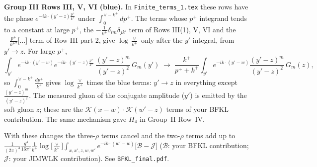 \documentclass[9pt]{article}
\numberwithin{equation}{section}
\newcommand{\new}[1]{{\color{blue}#1}}
\begin{document}
\new{\textbf{Group III Rows III, V, VI (blue).} In \texttt{Finite\_terms\_1.tex} these rows have the phase $e^{-ik\cdot(y'-z)\frac{p^+}{k^+}}$ under $\int_0^{\vee-k^+}dp^+$. The terms whose $p^+$ integrand tends to a constant at large $p^+$, the $-\frac{1}{k^+}\delta_{im}\delta_{jk'}$ term of Rows III(1), V, VI and the $-\frac{p^+}{k^{+2}}\big[\dots\big]$ term of Row III part 2, give $\log\frac{\vee}{k^+}$ only after the $y'$ integral, from $y'\to z$. For large $p^+$,
\begin{equation*}
\int_{y'}e^{-ik\cdot(y'-w)}e^{-ik\cdot(y'-z)\frac{p^+}{k^+}}\,\frac{(y'-z)^m}{(y'-z)^2}\,G_m(y')\;\to\;\frac{k^+}{p^++k^+}\int_{y'}e^{-ik\cdot(y'-w)}\frac{(y'-z)^m}{(y'-z)^2}\,G_m(z),
\end{equation*}
so $\int_0^{\vee-k^+}\frac{dp^+}{k^+}$ gives $\log\frac{\vee}{k^+}$ times the blue terms: $y'\to z$ in everything except $\frac{(y'-z)^m}{(y'-z)^2}$. The measured gluon of the conjugate amplitude ($y'$) is emitted by the soft gluon $z$; these are the $\mathcal K(x-w)\cdot\mathcal K(w'-z)$ terms of your BFKL contribution. The same mechanism gave $H_4$ in Group~II Row~IV.}

\new{With these changes the three-$\rho$ terms cancel and the two-$\rho$ terms add up to $\frac{1}{(2\pi)^3}\frac{g^4}{16\pi^5}\frac{1}{k^+}\log\big[\frac{\vee}{k^+}\big]\int_{x,x',z,w,w'}e^{-ik\cdot(w'-w)}\big[\mathcal B-\mathcal J\big]$ ($\mathcal B$: your BFKL contribution; $\mathcal J$: your JIMWLK contribution). See \texttt{BFKL\_final.pdf}.}
\end{document}
